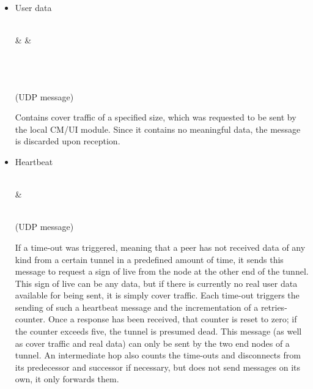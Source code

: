 \documentclass{article}
\begin{document}
\begin{itemize}
	\item User data \\
	
		\begin{bytefield}[bitwidth=1.0em]{32}
			 \\
			& 
			&  \\
			 \\
			\skippedwords \\	
		\end{bytefield} \\
		(UDP message)
		
		Contains cover traffic of a specified size, which was requested to be sent by the local CM/UI module. Since it contains no meaningful data, the message is discarded upon reception.
		
	\item Heartbeat \\
	
	\begin{bytefield}[bitwidth=1.0em]{32}
		\bitheader{0,7} \\
		& \bitbox{8}{HEARTBEAT}
	\end{bytefield} \\
	(UDP message)
	
	If a time-out was triggered, meaning that a peer has not received data of any kind from a certain tunnel in a predefined amount of time, it sends this message to request a sign of live from the node at the other end of the tunnel. This sign of live can be any data, but if there is currently no real user data available for being sent, it is simply cover traffic.
	Each time-out triggers the sending of such a heartbeat message and the incrementation of a retries-counter. Once a response has been received, that counter is reset to zero; if the counter exceeds five, the tunnel is presumed dead. This message (as well as cover traffic and real data) can only be sent by the two end nodes of a tunnel. An intermediate hop also counts the time-outs and disconnects from its predecessor and successor if necessary, but does not send messages on its own, it only forwards them.
\end{itemize}
	
\end{document}
